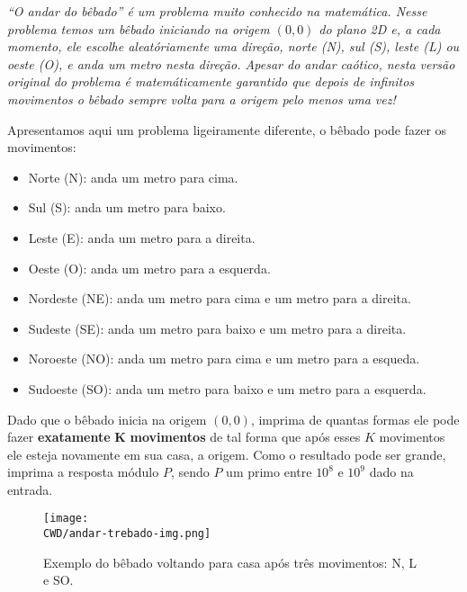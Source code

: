 %
\begin{center}
\textit{“O andar do bêbado” é um problema muito conhecido na matemática. Nesse problema temos um bêbado iniciando na origem $(0, 0)$ do plano 2D e, a cada momento, ele escolhe aleatóriamente uma direção, norte (N), sul (S), leste (L) ou oeste (O), e anda um metro nesta direção. Apesar do andar caótico, nesta versão original do problema é matemáticamente garantido que depois de infinitos movimentos o bêbado sempre volta para a origem pelo menos uma vez!}
\end{center}

Apresentamos aqui um problema ligeiramente diferente, o bêbado pode fazer os movimentos:
\begin{itemize}
    \item Norte (N): anda um metro para cima.
    \item Sul (S): anda um metro para baixo.
    \item Leste (E): anda um metro para a direita.
    \item Oeste (O): anda um metro para a esquerda.
    \item Nordeste (NE): anda um metro para cima e um metro para a direita.
    \item Sudeste (SE): anda um metro para baixo e um metro para a direita.
    \item Noroeste (NO): anda um metro para cima e um metro para a esqueda.
    \item Sudoeste (SO): anda um metro para baixo e um metro para a esquerda.
\end{itemize}

Dado que o bêbado inicia na origem $(0, 0)$, imprima de quantas formas ele pode fazer \textbf{exatamente} $\boldsymbol K$ \textbf{movimentos} de tal forma que após esses $K$ movimentos ele esteja novamente em sua casa, a origem. Como o resultado pode ser grande, imprima a resposta módulo $P$, sendo $P$ um primo entre $10^8$ e $10^9$ dado na entrada.

\begin{figure}[H]
    \centering
    \texttt{[image: \\CWD/andar-trebado-img.png]}
    \caption{Exemplo do bêbado voltando para casa após três movimentos: N, L e SO.}
\end{figure}


